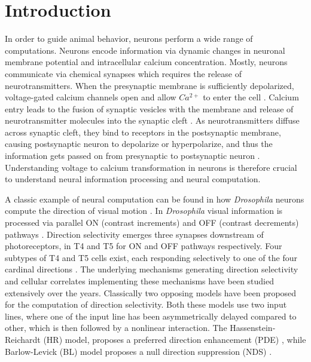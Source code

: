 \documentclass[9pt,lineno]{elife}
\begin{document}
\section{Introduction}
In order to guide animal behavior, neurons perform a wide range of computations. Neurons encode information via dynamic changes in neuronal membrane potential and intracellular calcium concentration. Mostly, neurons communicate via chemical synapses which requires the release of neurotransmitters. When the presynaptic membrane is sufficiently depolarized, voltage-gated calcium channels open and allow $Ca^{2+}$ to enter the cell \parencite{Llinas1981}. Calcium entry leads to the fusion of synaptic vesicles with the membrane and release of neurotransmitter molecules into the synaptic cleft \parencite{Chapman2002}.  As neurotransmitters diffuse across synaptic cleft, they bind to receptors in the postsynaptic membrane, causing postsynaptic neuron to depolarize or hyperpolarize, and thus the information gets passed on from presynaptic to postsynaptic neuron \parencite{DiMaio2008}. Understanding voltage to calcium transformation in neurons is therefore crucial to understand neural information processing and neural computation. 

A classic example of neural computation can be found in how \textit{Drosophila} neurons compute the direction of visual motion \parencite{Borst2020}. In \textit{Drosophila} visual information is processed via parallel ON (contrast increments) and OFF (contrast decrements) pathways \parencite{Joesch2010, Eichner2011}. Direction selectivity emerges three synapses downstream of photoreceptors, in T4 and T5 for ON and OFF pathways respectively. Four subtypes of T4 and T5 cells exist, each responding selectively to one of the four cardinal directions \parencite{Maisak2013}. The underlying mechanisms generating direction selectivity and cellular correlates implementing these mechanisms have been studied extensively over the years. Classically two opposing models have been proposed for the computation of direction selectivity. Both these models use two input lines, where one of the input line has been asymmetrically delayed compared to other, which is then followed by a nonlinear interaction. The Hassenstein-Reichardt (HR) model, proposes a preferred direction enhancement (PDE) \parencite{Hassenstein1956}, while Barlow-Levick (BL) model proposes a null direction suppression (NDS) \parencite{Barlow1965}. 
\end{document}
